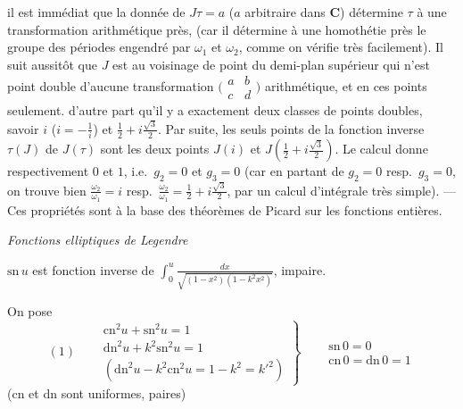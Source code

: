 \documentclass[11pt,a4paper]{article}
\begin{document}
il est immédiat que la donnée de $J\tau = a$ ($a$ arbitraire dans $\mathbf{C}$)
détermine $\tau$ à une transformation arithmétique près, (car il détermine à une
homothétie près le groupe des périodes engendré par $\omega_1$ et $\omega_2$,
comme on vérifie très facilement). Il suit aussitôt que $J$ est
\struck{\ill{}}  au voisinage de  point du
demi-plan supérieur qui n'est point double d'aucune transformation
$\bigl(\begin{smallmatrix} a & b\\ c & d\end{smallmatrix}\bigr)$ arithmétique, et en
ces points seulement.   
d'autre part qu'il y a exactement deux classes de points doubles, savoir $i$
($i = -\frac{1}{i}$) et $\frac12 + i\frac{\sqrt3}{2}$. Par suite, les seuls
points  \add{\ill{}} de la fonction inverse $\tau(J)$ de
$J(\tau)$ sont les deux points $J(i)$ et $J(\frac12 + i\frac{\sqrt3}{2})$.
Le calcul donne respectivement $0$ et $1$, i.e.\ $g_2 = 0$ et $g_3 = 0$ (car en
partant de $g_2 = 0$ resp.\ $g_3 = 0$, on trouve bien
$\frac{\omega_2}{\omega_1} = i$ resp.\ $\frac{\omega_2}{\omega_1} = \frac12 + i\frac{\sqrt3}{2}$,
par un calcul d'intégrale très simple). --- Ces propriétés sont à la base des
théorèmes de Picard sur les fonctions entières.

\emph{Fonctions elliptiques de Legendre}

$\mathrm{sn}\,u$ est fonction inverse de
$\int_0^u\frac{dx}{\sqrt{(1-x^2)(1-k^2x^2)}}$, impaire.

On pose
\[
(1)\quad \left.
\begin{aligned}
&\mathrm{cn}^2u + \mathrm{sn}^2u = 1\\
&\mathrm{dn}^2u + k^2\mathrm{sn}^2u = 1\\
&(\mathrm{dn}^2u - k^2\mathrm{cn}^2u = 1 - k^2 = k'^2)
\end{aligned}
\right\rbrace \quad
\begin{aligned}
&\mathrm{sn}\,0 = 0\\
&\mathrm{cn}\,0 = \mathrm{dn}\,0 = 1
\end{aligned}
\]
(cn et dn sont uniformes, paires)
\end{document}
